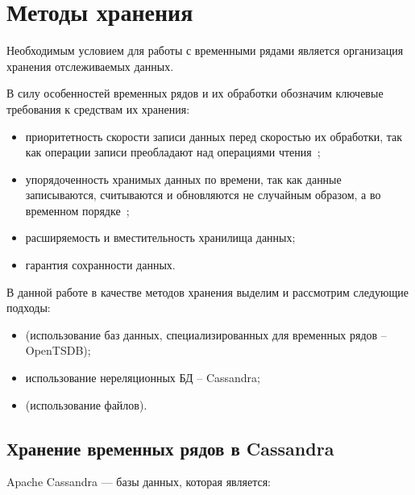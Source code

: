 \chapter{Методы хранения}

Необходимым условием для работы с временными рядами является организация хранения отслеживаемых данных.

В силу особенностей временных рядов и их обработки обозначим ключевые требования к средствам их хранения:
\begin{itemize}
    \item приоритетность скорости записи данных перед скоростью их обработки, так как операции записи преобладают над операциями чтения~\cite{myref7};
    \item упорядоченность хранимых данных по времени, так как данные записываются, считываются и обновляются не случайным образом, а во временном порядке~\cite{myref7};
    \item расширяемость и вместительность хранилища данных;
    \item гарантия сохранности данных. 
\end{itemize}

В данной работе в качестве методов хранения выделим и рассмотрим следующие подходы:

\begin{itemize}
    \item (использование баз данных, специализированных для временных рядов -- OpenTSDB);
    \item использование нереляционных БД -- Cassandra;
    \item (использование файлов).
\end{itemize}

\section{Хранение временных рядов в Cassandra}

Apache Cassandra --- базы данных, которая является:

